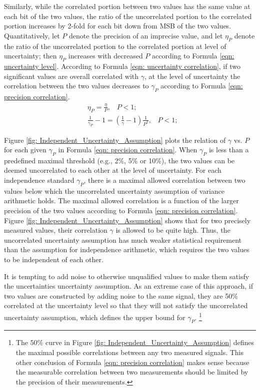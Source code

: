 \documentclass[twoside]{article}
\numberwithin{equation}{section}
\newcommand{\eqspace}{\;\;\;}
\begin{document}
Similarly, while the correlated portion between two values has the same value at each bit of the two values, the ratio of the uncorrelated portion to the correlated portion increases by 2-fold for each bit down from MSB of the two values. 
Quantitatively, let $P$ denote the precision of an imprecise value, and let $\eta_{P}$ denote the ratio of the uncorrelated portion to the correlated portion at level of uncertainty; then $\eta_{P}$ increases with decreased $P$ according to Formula \eqref{eqn: uncertainty level}. 
According to Formula \eqref{eqn: uncertainty correlation}, if two significant values are overall correlated with $\gamma$, at the level of uncertainty the correlation between the two values decreases to $\gamma_P$ according to Formula \eqref{eqn: precision correlation}.
\begin{align}
\label{eqn: uncertainty level}
& \eta_{P} = \frac{\eta}{P}, \eqspace P < 1; \\
\label{eqn: precision correlation}
& \frac{1}{\gamma_{P}} - 1 = \left(\frac{1}{\gamma} -1\right) \frac{1}{P^2}, \eqspace P < 1;
\end{align}

Figure \ref{fig: Independent_Uncertainty_Assumption} plots the relation of $\gamma$ vs. $P$ for each given $\gamma_{P}$ in Formula \eqref{eqn: precision correlation}.  
When $\gamma_{P}$ is less than a predefined maximal threshold (e.g., 2\%, 5\% or 10\%), the two values can be deemed uncorrelated to each other at the level of uncertainty.  
For each independence standard $\gamma_{P}$, there is a maximal allowed correlation between two values below which the uncorrelated uncertainty assumption of variance arithmetic holds.  
The maximal allowed correlation is a function of the larger precision of the two values according to Formula \eqref{eqn: precision correlation}.  
Figure \ref{fig: Independent_Uncertainty_Assumption} shows that for two precisely measured values, their correlation $\gamma$ is allowed to be quite high.  
Thus, the uncorrelated uncertainty assumption has much weaker statistical requirement than the assumption for independence arithmetic, which requires the two values to be independent of each other.

It is tempting to add noise to otherwise unqualified values to make them satisfy the uncertainties uncertainty assumption.  
As an extreme case of this approach, if two values are constructed by adding noise to the same signal, they are 50\% correlated at the uncertainty level so that they will not satisfy the uncorrelated uncertainty assumption, which defines the upper bound for $\gamma_{P}$. 
\footnote{
The $50\%$ curve in Figure \ref{fig: Independent_Uncertainty_Assumption} defines the maximal possible correlations between any two measured signals. 
This other conclusion of Formula \eqref{eqn: precision correlation} makes sense because the measurable correlation between two measurements should be limited by the precision of their measurements.
}
\end{document}
